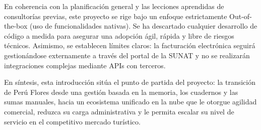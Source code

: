 En coherencia con la planificación general y las lecciones aprendidas de consultorías previas, este proyecto se rige bajo un enfoque estrictamente Out-of-the-box (uso de funcionalidades nativas). Se ha descartado cualquier desarrollo de código a medida para asegurar una adopción ágil, rápida y libre de riesgos técnicos. Asimismo, se establecen límites claros: la facturación electrónica seguirá gestionándose externamente a través del portal de la SUNAT y no se realizarán integraciones complejas mediante APIs con terceros.

En síntesis, esta introducción sitúa el punto de partida del proyecto: la transición de Perú Flores desde una gestión basada en la memoria, los cuadernos y las sumas manuales, hacia un ecosistema unificado en la nube que le otorgue agilidad comercial, reduzca su carga administrativa y le permita escalar su nivel de servicio en el competitivo mercado turístico.
